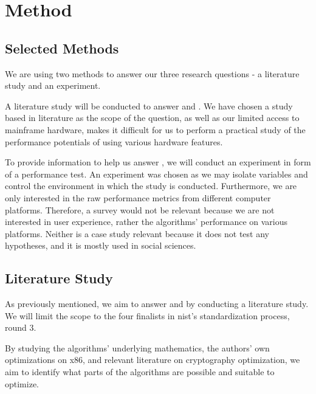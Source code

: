\chapter{Method}
\label{chapter:method}

\section{Selected Methods}
\label{section:method:selected-method}

We are using two methods to answer our three research questions - a literature study and an experiment.

A literature study will be conducted to answer  and . We have chosen a study based in literature as the scope of the question, as well as our limited access to mainframe hardware, makes it difficult for us to perform a practical study of the performance potentials of using various hardware features.

To provide information to help us answer , we will conduct an experiment in form of a performance test. An experiment was chosen as we may isolate variables and control the environment in which the study is conducted. Furthermore, we are only interested in the raw performance metrics from different computer platforms. Therefore, a survey would not be relevant because we are not interested in user experience, rather the algorithms' performance on various platforms. Neither is a case study relevant because it does not test any hypotheses, and it is mostly used in social sciences\cite{wohlin2012}.

\section{Literature Study}
\label{section:method:literature-study}

As previously mentioned, we aim to answer  and  by conducting a literature study. We will limit the scope to the four finalists in \gls{nist}'s standardization process, round 3.

By studying the algorithms' underlying mathematics, the authors' own optimizations on \gls{x86}, and relevant literature on cryptography optimization, we aim to identify what parts of the algorithms are possible and suitable to optimize.

